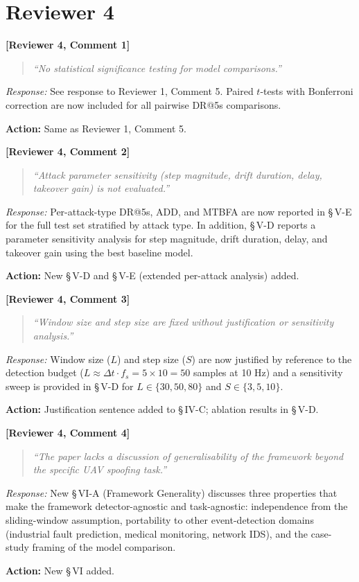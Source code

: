 \documentclass[11pt, a4paper]{article}
\newcommand{\reviewer}[2]{\medskip\noindent\textbf{\textcolor{revcolor}{[Reviewer #1, Comment #2]}}\par}
\newcommand{\response}[1]{\noindent\textit{Response:} #1\par}
\newcommand{\action}[1]{\noindent\textcolor{actcolor}{\textbf{Action:} #1}\smallskip\par}
\newcommand{\quoterev}[1]{\begin{quote}\textit{``#1''}\end{quote}}
\begin{document}
\section*{Reviewer 4}

\reviewer{4}{1}
\quoterev{No statistical significance testing for model comparisons.}
\response{%
  See response to Reviewer 1, Comment 5. Paired $t$-tests with Bonferroni
  correction are now included for all pairwise DR@5s comparisons.}
\action{Same as Reviewer 1, Comment 5.}

\reviewer{4}{2}
\quoterev{Attack parameter sensitivity (step magnitude, drift duration, delay,
  takeover gain) is not evaluated.}
\response{%
  Per-attack-type DR@5s, ADD, and MTBFA are now reported in \S\,V-E
  for the full test set stratified by attack type.
  In addition, \S\,V-D reports a parameter sensitivity analysis for step
  magnitude, drift duration, delay, and takeover gain using the best
  baseline model.}
\action{New \S\,V-D and \S\,V-E (extended per-attack analysis) added.}

\reviewer{4}{3}
\quoterev{Window size and step size are fixed without justification or sensitivity
  analysis.}
\response{%
  Window size ($L$) and step size ($S$) are now justified by reference to the
  detection budget ($L \approx \Delta t \cdot f_s = 5 \times 10 = 50$ samples at 10 Hz)
  and a sensitivity sweep is provided in \S\,V-D for $L\in\{30,50,80\}$ and
  $S\in\{3,5,10\}$.}
\action{Justification sentence added to \S\,IV-C; ablation results in \S\,V-D.}

\reviewer{4}{4}
\quoterev{The paper lacks a discussion of generalisability of the framework beyond
  the specific UAV spoofing task.}
\response{%
  New \S\,VI-A (Framework Generality) discusses three properties that make the
  framework detector-agnostic and task-agnostic: independence from the
  sliding-window assumption, portability to other event-detection domains
  (industrial fault prediction, medical monitoring, network IDS), and the
  case-study framing of the model comparison.}
\action{New \S\,VI added.}
\end{document}
